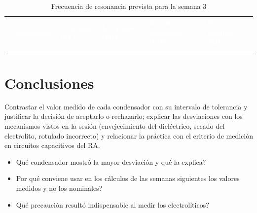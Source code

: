 \documentclass[12pt]{article}
\begin{document}
\begin{table}[H]
  \centering
  \caption{Frecuencia de resonancia prevista para la semana 3}
  \label{tab:registro-2}
  \begin{tabularx}{\linewidth}{>{\raggedright\arraybackslash}X>{\raggedright\arraybackslash}X>{\raggedright\arraybackslash}X>{\raggedright\arraybackslash}X>{\raggedright\arraybackslash}X}
    \rowcolor{iubnavy} \textcolor{white}{\textbf{Condensador}} & \textcolor{white}{\textbf{C medida (nF)}} & \textcolor{white}{\textbf{L supuesta (mH)}} & \textcolor{white}{\textbf{fr con nominales (kHz)}} & \textcolor{white}{\textbf{fr con medida (kHz)}} \\
    \rule{0pt}{0.8cm} & & & & \\
    \rowcolor{iubfondogris} \rule{0pt}{0.8cm} & & & & \\
    \bottomrule
  \end{tabularx}
\end{table}

\section{Conclusiones}\label{sec:conclusiones}
Contrastar el valor medido de cada condensador con su intervalo de tolerancia y justificar la decisión de aceptarlo o rechazarlo; explicar las desviaciones con los mecanismos vistos en la sesión (envejecimiento del dieléctrico, secado del electrolito, rotulado incorrecto) y relacionar la práctica con el criterio de medición en circuitos capacitivos del RA.
\lineablanco
\begin{itemize}
  \item \textquestiondown{}Qué condensador mostró la mayor desviación y qué la explica?
  \item \textquestiondown{}Por qué conviene usar en los cálculos de las semanas siguientes los valores medidos y no los nominales?
  \item \textquestiondown{}Qué precaución resultó indispensable al medir los electrolíticos?
\end{itemize}

\end{document}
